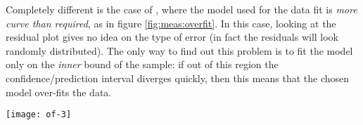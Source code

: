 	Completely different is the case of , where the model used for the data fit is \textit{more curve than required}, as in figure \ref{fig:meas:overfit}. In this case, looking at the residual plot gives no idea on the type of error (in fact the residuals will look randomly distributed). The only way to find out this problem is to fit the model only on the \textit{inner} bound of the sample: if out of this region the confidence/prediction interval diverges quickly, then this means that the chosen model over-fits the data.
	
	\begin{SCfigure}[2][bht]
		\centering
		\texttt{[image: of-3]}
		\caption{example of "quadratic distributed" data fitted with a grade 9 polynomial. In this case the fit is made only with values in the domain $[1,9]$.} \label{fig:meas:overfit}
	\end{SCfigure}
